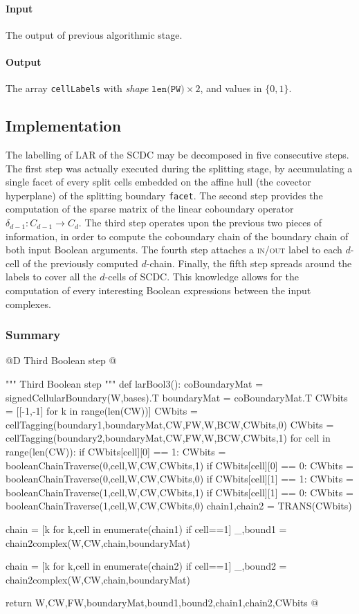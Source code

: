 \documentclass[11pt,oneside]{article}	%
\begin{document}
\paragraph{Input}
The output of previous algorithmic stage.

\paragraph{Output}
The array \texttt{cellLabels} with \emph{shape} $\texttt{len(PW)}\times 2$, and values in $\{0,1\}$.


\subsection{Implementation}

The labelling of LAR of the SCDC may be decomposed in five consecutive steps. The first step was actually executed during the splitting stage, by accumulating a single facet of every split cells embedded on the affine hull (the covector hyperplane) of the splitting boundary \texttt{facet}. The second  step provides the computation of the sparse matrix of the linear coboundary operator $\delta_{d-1}: C_{d-1} \to C_d$.
The third step operates upon the previous two pieces of information, in order to compute the coboundary chain of the boundary chain of both input Boolean arguments.
The fourth step attaches a \textsc{in/out} label to each $d$-cell of the previously computed $d$-chain.
Finally, the fifth step spreads around the labels to cover all the $d$-cells of SCDC. This knowledge allows for the computation of every interesting Boolean expressions between the input complexes.

\subsubsection{Summary}

@D Third Boolean step
@{""" Third Boolean step """
def larBool3():
	coBoundaryMat = signedCellularBoundary(W,bases).T
	boundaryMat = coBoundaryMat.T
	CWbits = [[-1,-1] for k in range(len(CW))]
	CWbits = cellTagging(boundary1,boundaryMat,CW,FW,W,BCW,CWbits,0)
	CWbits = cellTagging(boundary2,boundaryMat,CW,FW,W,BCW,CWbits,1)
	for cell in range(len(CW)):
		if CWbits[cell][0] == 1:
			CWbits = booleanChainTraverse(0,cell,W,CW,CWbits,1)		
		if CWbits[cell][0] == 0:
			CWbits = booleanChainTraverse(0,cell,W,CW,CWbits,0)
		if CWbits[cell][1] == 1:
			CWbits = booleanChainTraverse(1,cell,W,CW,CWbits,1)
		if CWbits[cell][1] == 0:
			CWbits = booleanChainTraverse(1,cell,W,CW,CWbits,0)
	chain1,chain2 = TRANS(CWbits)
	
	chain = [k for k,cell in enumerate(chain1) if cell==1]
	_,bound1 = chain2complex(W,CW,chain,boundaryMat)
	
	chain = [k for k,cell in enumerate(chain2) if cell==1]
	_,bound2 = chain2complex(W,CW,chain,boundaryMat)
	
	return W,CW,FW,boundaryMat,bound1,bound2,chain1,chain2,CWbits
@}
\end{document}
